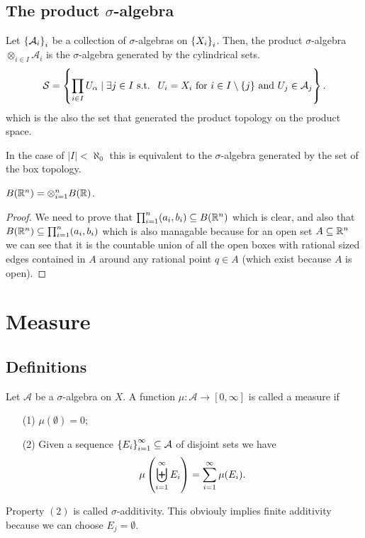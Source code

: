 \documentclass[11pt,a4paper]{article}
\newcommand{\A}{\mathcal A}
\begin{document}
\subsection{The product \texorpdfstring{$\sigma$}{s}-algebra}

\begin{definition}
  Let $\set{\A_{i}}_{i}$ be a collection of $\sigma$-algebras on
  $\set{X_{i}}_{i}$.
  Then, the product $\sigma$-algebra $\otimes_{i \in I} \A_{i}$ is
  the $\sigma$-algebra generated by the cylindrical sets.
  \[
    \mathcal{S} = \set{\prod_{i \in I}{U_{\alpha}} \mid 
    \exists j \in I \st 
    \text{ $U_{i} = X_{i}$ 
    for $i \in I \setminus \{j\}$ and $U_j \in \A_j$}}.
  \]
  which is the also the set that generated the product topology on
  the product space.
\end{definition}
\begin{remark}
  In the case of $|I| < \aleph_0$ this is equivalent to the $\sigma$-algebra
  generated by the set of the box topology.
\end{remark}

\begin{proposition}
  $B(\mathbb{R}^n) = \otimes_{i=1}^{n} B(\mathbb{R})$.
\end{proposition}
\begin{proof}
  We need to prove that $\prod_{i=1}^{n} (a_i, b_i) \subseteq B(\mathbb{R}^n)$
  which is clear, and also that $B(\mathbb{R}^n) \subseteq \prod_{i=1}^{n} (a_i, b_i)$
  which is also managable because for an open set $A \subseteq \mathbb{R}^n$ we
  can see that it is the countable union of all the open boxes with
  rational sized edges contained in $A$ around any rational point $q \in A$
  (which exist because $A$ is open).
\end{proof}

\section{Measure}
\subsection{Definitions}

\begin{definition}[Measure]
  Let $\A$ be a $\sigma$-algebra on $X$.
  A function $\mu \colon \A \to [0,\infty]$ is called a measure if
  \begin{enumerate}
  \item[(1)] $\mu(\emptyset) = 0$;
  \item[(2)] Given a sequence $\set{E_i}_{i=1}^{\infty} \subseteq \A$ of
    disjoint sets we have
    \[
      \mu\del{\biguplus_{i=1}^{\infty} E_i} =
      \sum_{i=1}^{\infty} \mu(E_i).
    \]
  \end{enumerate}
\end{definition}
\begin{remark}
  Property $(2)$ is called $\sigma$-additivity.
  This obviouly implies finite additivity because we can choose 
  $E_j = \emptyset$.
\end{remark}
\end{document}
